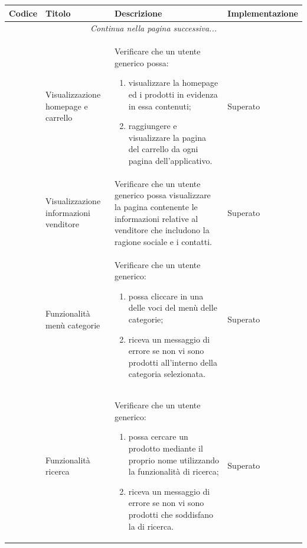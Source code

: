 \begin{center}
	\begin{longtable}{|p{0.85cm}|p{2.25cm}|p{9cm}|p{3cm}|}
		\hline
		\rowcolor{lighter-grayer}
		\textbf{Codice} & \textbf{Titolo} & \textbf{Descrizione} & \textbf{Implementazione} \\
		\hline
		\endfirsthead
		\hline
		\multicolumn{4}{|c|}{\textit{Continua nella pagina successiva...}} \\
		\hline
		\endfoot
		\endlastfoot

		\hline
		
		 & Visualizzazione homepage e carrello & Verificare che un utente generico possa:
		\begin{enumerate}
			\item  visualizzare la homepage ed i prodotti in evidenza in essa contenuti;
			\item  raggiungere e visualizzare la pagina del carrello da ogni pagina dell'applicativo.
		\end{enumerate} & Superato\\

		 & Visualizzazione informazioni venditore & Verificare che un utente generico possa visualizzare la pagina contenente le informazioni relative al venditore che includono la ragione sociale e i contatti. & Superato \\

		 & Funzionalità menù categorie & Verificare che un utente generico: 
		\begin{enumerate}
			\item  possa cliccare in una delle voci del menù delle categorie;
			\item  riceva un messaggio di errore se non vi sono prodotti all'interno della categoria selezionata.
		\end{enumerate} & Superato\\

		 & Funzionalità ricerca & Verificare che un utente generico: 
		\begin{enumerate}
			\item  possa cercare un prodotto mediante il proprio nome utilizzando la funzionalità di ricerca;
			\item  riceva un messaggio di errore se non vi sono prodotti che soddisfano la \glock{query} di ricerca.
		\end{enumerate} & Superato \\


\end{longtable}
\end{center}
